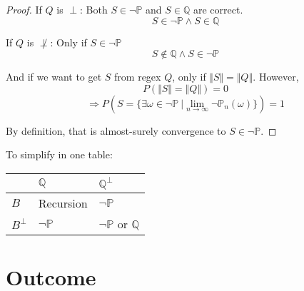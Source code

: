 \documentclass[12pt,a4paper]{article}
\begin{document}
\begin{CJK}{UTF8}{bsmi}
\begin{enumerate}
\begin{proof}
                  If $Q$ is $\perp$:
                  Both $S \in \neg \mathbb{P}$ and $S \in \mathbb{Q}$ are correct.
                  \begin{equation}
                      S \in \neg \mathbb{P} \land S \in \mathbb{Q}
                  \end{equation}

                  If $Q$ is $\not\perp$: Only if $S \in \neg\mathbb{P}$
                  \begin{equation}
                      S \not\in \mathbb{Q} \land S \in \neg\mathbb{P}
                  \end{equation}

                  And if we want to get $S$ from regex $Q$, only if
                  $\mathbin\Vert S \mathbin\Vert = \mathbin\Vert Q \mathbin\Vert$.
                  However,
                  $$P(\mathbin\Vert S \mathbin\Vert = \mathbin\Vert Q \mathbin\Vert)=0$$
                  $$\Rightarrow P(S = \{\exists \omega \in \neg \mathbb{P} \ | \lim_{n \to \infty} \neg \mathbb{P}_{n}(\omega) \}) = 1$$

                  By definition, that is almost-surely convergence to $S \in \neg\mathbb{P}$.
              \end{proof}

              To simplify in one table:\\
              \begin{center}
                  \begin{tabularx}{6cm} {
                          | >{\raggedright\arraybackslash}X
                          | >{\centering\arraybackslash}X
                          | >{\raggedleft\arraybackslash}X |}
                      \hline
                      \mbox{}     & $\mathbb{Q}$     & $\mathbb{Q}^{\perp}$                \\
                      \hline
                      $B$         & Recursion        & $\neg\mathbb{P}$                    \\
                      \hline
                      $B^{\perp}$ & $\neg\mathbb{P}$ & $\neg\mathbb{P}$ or    $\mathbb{Q}$ \\
                      \hline
                  \end{tabularx}
              \end{center}
    \end{enumerate}

    \section{Outcome}
    

\end{CJK}
\end{document}
